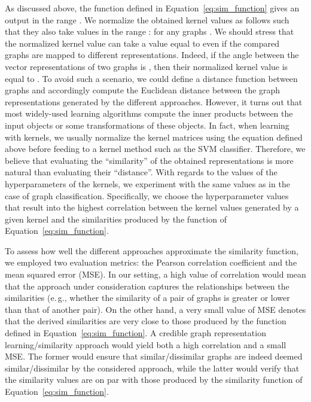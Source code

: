 \documentclass[twoside,11pt]{article}
\newcommand{\eg}{e.\,g., }
\begin{document}
As discussed above, the function defined in Equation~\eqref{eq:sim_function} gives an output in the range .
We normalize the obtained kernel values as follows such that they also take values in the range :  for any graphs .
We should stress that the normalized kernel value can take a value equal to  even if the compared graphs are mapped to different representations.
Indeed, if the angle between the vector representations of two graphs is , then their normalized kernel value is equal to .
To avoid such a scenario, we could define a distance function between graphs and accordingly compute the Euclidean distance between the graph representations generated by the different approaches.
However, it turns out that most widely-used learning algorithms compute the inner products between the input objects or some transformations of these objects. 
In fact, when learning with kernels, we usually normalize the kernel matrices using the equation defined above before feeding to a kernel method such as the SVM classifier.
Therefore, we believe that evaluating the ``similarity'' of the obtained representations is more natural than evaluating their ``distance''.
With regards to the values of the hyperparameters of the  kernels, we experiment with the same values as in the case of graph classification.
Specifically, we choose the hyperparameter values that result into the highest correlation between the kernel values generated by a given kernel and the similarities produced by the function of Equation~\eqref{eq:sim_function}.

To assess how well the different approaches approximate the similarity function, we employed two evaluation metrics: the Pearson correlation coefficient and the mean squared error (MSE).
In our setting, a high value of correlation would mean that the approach under consideration captures the relationships between the similarities (\eg whether the similarity of a pair of graphs is greater or lower than that of another pair).
On the other hand, a very small value of MSE denotes that the derived similarities are very close to those produced by the function defined in Equation~\eqref{eq:sim_function}.
A credible graph representation learning/similarity approach would yield both a high correlation and a small MSE.
The former would ensure that similar/dissimilar graphs are indeed deemed similar/dissimilar by the considered approach, while the latter would verify that the similarity values are on par with those produced by the similarity function of Equation~\eqref{eq:sim_function}.
\end{document}
